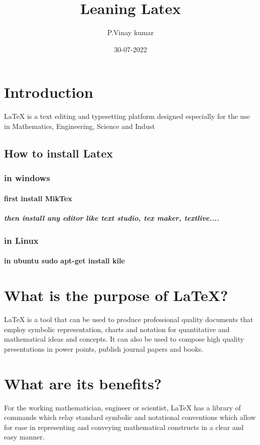 \documentclass[12pt]{article}
\title{Leaning Latex}
\author{P.Vinay kumar}
\date{30-07-2022}
\begin{document}
\maketitle
\tableofcontents
\section{Introduction }

LaTeX is a text editing and typesetting platform designed
especially for the use in Mathematics, Engineering, Science and Indust
\subsection{How to install Latex}
\subsubsection{in windows}
\paragraph{first install MikTex}
\subparagraph{then install any editor like text studio, tex maker, textlive....}
\subsubsection{in Linux}
\paragraph{in ubuntu sudo apt-get install kile}

\section{What is the purpose of LaTeX?}
LaTeX is a tool that can be used to produce professional quality
documents that employ symbolic representation, charts and notation for
quantitative and mathematical ideas and concepts. It can also be used to
compose high quality presentations in power points, publish journal papers
and books.
\section{What are its benefits?}


For the working mathematician, engineer or scientist, LaTeX has a library
of commands which relay standard symbolic and notational conventions
which allow for ease in representing and conveying mathematical
constructs in a clear and easy manner.
\end{document}
